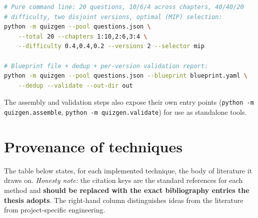 \documentclass[11pt,a4paper]{article}
\newcommand{\code}[1]{\texttt{\small #1}}
\begin{document}
\begin{lstlisting}[language=bash]
# Pure command line: 20 questions, 10/6/4 across chapters, 40/40/20
# difficulty, two disjoint versions, optimal (MIP) selection:
python -m quizgen --pool questions.json \
    --total 20 --chapters 1:10,2:6,3:4 \
    --difficulty 0.4,0.4,0.2 --versions 2 --selector mip

# Blueprint file + dedup + per-version validation report:
python -m quizgen --pool questions.json --blueprint blueprint.yaml \
    --dedup --validate --out-dir out
\end{lstlisting}

The assembly and validation steps also expose their own entry points
(\code{python -m quizgen.assemble}, \code{python -m quizgen.validate}) for use
as standalone tools.

\section{Provenance of techniques}
\label{sec:sources}

The table below states, for each implemented technique, the body of literature
it draws on. \emph{Honesty note:} the citation keys are the standard references
for each method and \textbf{should be replaced with the exact bibliography
entries the thesis adopts}. The right-hand column distinguishes ideas from the
literature from project-specific engineering.
\end{document}
